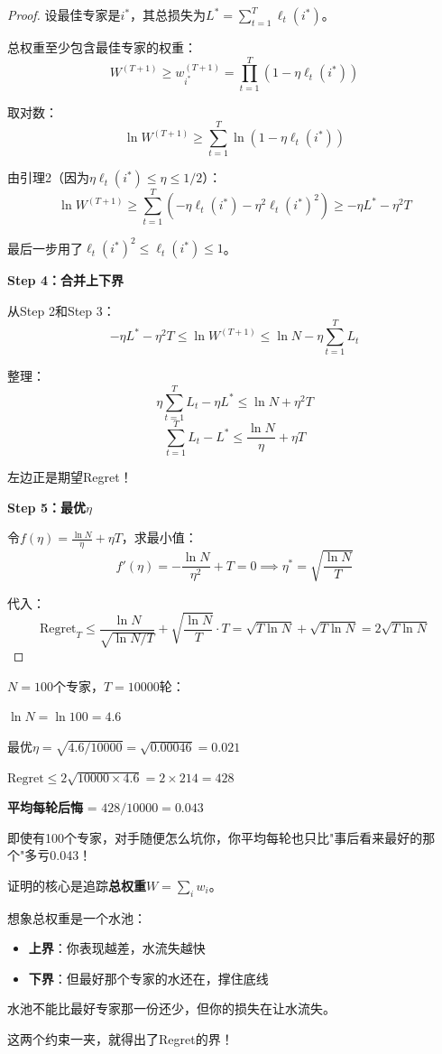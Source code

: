 \documentclass[11pt,a4paper]{article}
\theoremstyle{definition}
\begin{document}
\begin{proof}
设最佳专家是$i^*$，其总损失为$L^* = \sum_{t=1}^T \ell_t(i^*)$。

总权重至少包含最佳专家的权重：
\[
W^{(T+1)} \geq w_{i^*}^{(T+1)} = \prod_{t=1}^T (1 - \eta \ell_t(i^*))
\]

取对数：
\[
\ln W^{(T+1)} \geq \sum_{t=1}^T \ln(1 - \eta \ell_t(i^*))
\]

由引理2（因为$\eta \ell_t(i^*) \leq \eta \leq 1/2$）：
\[
\ln W^{(T+1)} \geq \sum_{t=1}^T \left(-\eta \ell_t(i^*) - \eta^2 \ell_t(i^*)^2\right) \geq -\eta L^* - \eta^2 T
\]

最后一步用了$\ell_t(i^*)^2 \leq \ell_t(i^*) \leq 1$。

\textbf{Step 4：合并上下界}

从Step 2和Step 3：
\[
-\eta L^* - \eta^2 T \leq \ln W^{(T+1)} \leq \ln N - \eta \sum_{t=1}^T L_t
\]

整理：
\[
\eta \sum_{t=1}^T L_t - \eta L^* \leq \ln N + \eta^2 T
\]
\[
\sum_{t=1}^T L_t - L^* \leq \frac{\ln N}{\eta} + \eta T
\]

左边正是期望Regret！

\textbf{Step 5：最优$\eta$}

令$f(\eta) = \frac{\ln N}{\eta} + \eta T$，求最小值：
\[
f'(\eta) = -\frac{\ln N}{\eta^2} + T = 0 \implies \eta^* = \sqrt{\frac{\ln N}{T}}
\]

代入：
\[
\text{Regret}_T \leq \frac{\ln N}{\sqrt{\ln N/T}} + \sqrt{\frac{\ln N}{T}} \cdot T = \sqrt{T \ln N} + \sqrt{T \ln N} = 2\sqrt{T \ln N}
\]
\end{proof}

\begin{calculation}[代数字感受一下]
$N = 100$个专家，$T = 10000$轮：

$\ln N = \ln 100 = 4.6$

最优$\eta = \sqrt{4.6 / 10000} = \sqrt{0.00046} = 0.021$

$\text{Regret} \leq 2\sqrt{10000 \times 4.6} = 2 \times 214 = 428$

\textbf{平均每轮后悔} = $428 / 10000 = 0.043$

即使有100个专家，对手随便怎么坑你，你平均每轮也只比"事后看来最好的那个"多亏0.043！
\end{calculation}

\begin{plainwords}[证明的直觉]
证明的核心是追踪\textbf{总权重}$W = \sum_i w_i$。

想象总权重是一个水池：
\begin{itemize}
    \item \textbf{上界}：你表现越差，水流失越快
    \item \textbf{下界}：但最好那个专家的水还在，撑住底线
\end{itemize}

水池不能比最好专家那一份还少，但你的损失在让水流失。

这两个约束一夹，就得出了Regret的界！
\end{plainwords}
\end{document}
